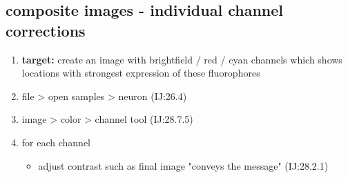 \documentclass[11pt]{article}
\begin{document}
\subsection{composite images - individual channel corrections}
\label{sec-2-3}
\begin{enumerate}
\item \textbf{target:} create an image with brightfield / red / cyan channels
which shows locations with strongest expression of these fluorophores
\item file > open samples > neuron (IJ:26.4)
\item image > color > channel tool (IJ:28.7.5)
\item for each channel 
\begin{itemize}
\item adjust contrast such as final image "conveys the message" (IJ:28.2.1)
\end{itemize}
\end{enumerate}
\end{document}
